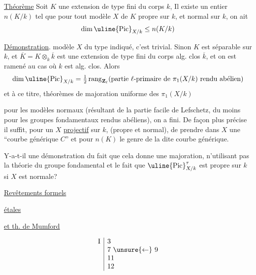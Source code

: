 \uline{Théorème} Soit $K$ une extension de type fini du
corps $k$, 
 Il
existe un entier $n(K/k)$
tel que pour tout modèle $X$ de $K$ propre sur $k$, et
normal sur $k$,  on ait 
\[
\dim\uline{\mathrm{Pic}}_{X/k}\leq n(K/k)
\]

\uline{Démonstration}. 
modèle $X$ du type indiqué, c'est trivial.
Sinon $K$ est séparable sur $k$, et
$\overline K=K\otimes_k\overline k$ est une extension de type
fini du corps alg. clos $\overline k$, et on
est ramené au cas où $k$ est alg. clos.
Alors
\[
\dim\uline{\mathrm{Pic}}_{X/k}
=\tfrac12\operatorname{rang}_{\mathbf Z_\ell}
(\text{partie $\ell$-primaire de }\pi_1(X/k)\text{ rendu abélien})
\]
et à ce titre,  théorèmes
de majoration uniforme des $\pi_1(X/k)$

pour les modèles normaux (résultant de
la partie facile de Lefschetz, du moins pour
les groupes fondamentaux rendus abéliens),
on a fini. De façon plus précise
il suffit, pour un  $X$ \uline{projectif} sur $k$,
(propre et normal), de prendre dans $X$
une ``courbe générique $C$'' et pour
$n(K)$ le genre de la dite courbe
générique.


Y-a-t-il une démonstration du fait
que cela donne une majoration, n'utilisant
pas la théorie du groupe fondamental
et le fait que $\uline{\mathrm{Pic}}^\tau_{X/k}$ est propre sur $k$
si $X$ est normale?


\uline{Revêtements formels}

\uline{étales}

\uline{et th. de Mumford}

\[
\begin{array}{c|l}
\mathrm I&3\\
&7\ \unsure{\leftarrow}\ 9\\
&11\\
&12
\end{array}
\]

